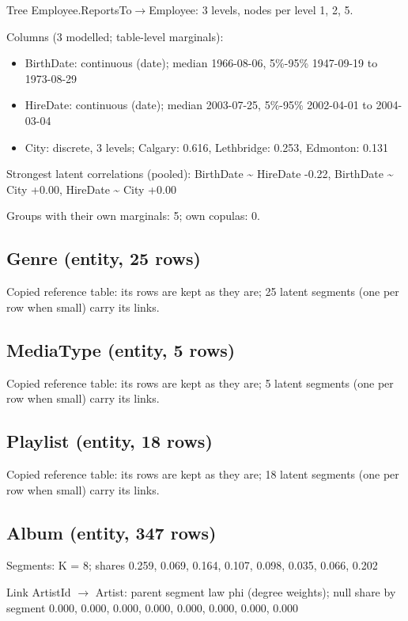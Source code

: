 \documentclass[10pt]{article}
\begin{document}
Tree Employee.ReportsTo$\rightarrow$Employee: 3 levels, nodes per level 1, 2, 5.

Columns (3 modelled; table-level marginals):


\begin{itemize}
\item BirthDate: continuous (date); median 1966-08-06, 5\%-95\% 1947-09-19 to 1973-08-29
\item HireDate: continuous (date); median 2003-07-25, 5\%-95\% 2002-04-01 to 2004-03-04
\item City: discrete, 3 levels; Calgary: 0.616, Lethbridge: 0.253, Edmonton: 0.131
\end{itemize}
Strongest latent correlations (pooled): BirthDate \textasciitilde{} HireDate -0.22, BirthDate \textasciitilde{} City +0.00, HireDate \textasciitilde{} City +0.00

Groups with their own marginals: 5; own copulas: 0.



\subsection*{Genre (entity, 25 rows)}
Copied reference table: its rows are kept as they are; 25 latent segments (one per row when small) carry its links.


\subsection*{MediaType (entity, 5 rows)}
Copied reference table: its rows are kept as they are; 5 latent segments (one per row when small) carry its links.


\subsection*{Playlist (entity, 18 rows)}
Copied reference table: its rows are kept as they are; 18 latent segments (one per row when small) carry its links.


\subsection*{Album (entity, 347 rows)}
Segments: K = 8; shares 0.259, 0.069, 0.164, 0.107, 0.098, 0.035, 0.066, 0.202

Link ArtistId $\rightarrow$ Artist: parent segment law phi (degree weights); null share by segment 0.000, 0.000, 0.000, 0.000, 0.000, 0.000, 0.000, 0.000
\end{document}
